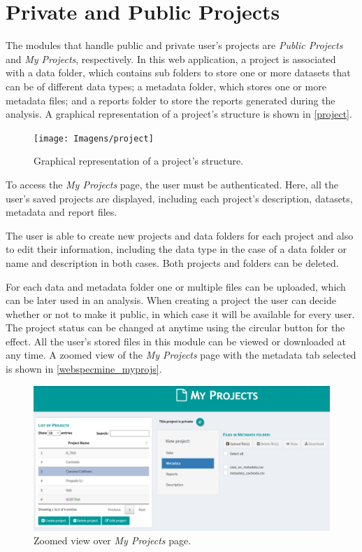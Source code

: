 \section{Private and Public Projects}

The modules that handle public and private user's projects are \textit{Public Projects} and \textit{My Projects}, respectively. In this web application, a project is associated with a data folder, which contains sub folders to store one or more datasets that can be of different data types; a metadata folder, which stores one or more metadata files; and a reports folder to store the reports generated during the analysis. A graphical representation of a project's structure is shown in \autoref{project}.

\begin{figure}[h]
	\centering
	\texttt{[image: Imagens/project]}
	\caption{Graphical representation of a project's structure.}
	\label{project}
\end{figure}

To access the \textit{My Projects} page, the user must be authenticated. Here, all the user's saved projects are displayed, including each project's description, datasets, metadata and report files. 

The user is able to create new projects and data folders for each project and also to edit their information, including the data type in the case of a data folder or name and description in both cases. Both projects and folders can be deleted.

For each data and metadata folder one or multiple files can be uploaded, which can be later used in an analysis. When creating a project the user can decide whether or not to make it public, in which case it will be available for every user. The project status can be changed at anytime using the circular button for the effect. All the user's stored files in this module can be viewed or downloaded at any time. A zoomed view of the \textit{My Projects} page with the metadata tab selected is shown in \autoref{webspecmine_myprojs}.

\begin{figure}[h]
	\centering
	\includegraphics[width=0.9\linewidth]{Imagens/webspecmine_myprojs}
	\caption{Zoomed view over \textit{My Projects} page.}
	\label{webspecmine_myprojs}
\end{figure}

